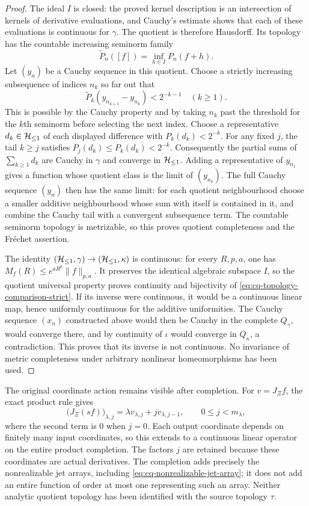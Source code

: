\begin{proof}
The ideal $I$ is closed: the proved kernel description is an
intersection of kernels of derivative evaluations, and Cauchy's
estimate shows that each of these evaluations is continuous for
$\gamma$. The quotient is therefore Hausdorff. Its topology has
the countable increasing seminorm family
\[
 \widetilde P_n([f])=\inf_{h\in I}P_n(f+h).
\]
Let $(y_n)$ be a Cauchy sequence in this quotient. Choose a
strictly increasing subsequence of indices $n_k$ so far out that
\[
 \widetilde P_k(y_{n_{k+1}}-y_{n_k})<2^{-k-1}
 \quad(k\geq1).
\]
This is possible by the Cauchy property and by taking $n_k$ past
the threshold for the $k$th seminorm before selecting the next
index. Choose a representative $d_k\in\mathcal H_{\leq 1}$ of each displayed
difference with $P_k(d_k)<2^{-k}$. For any fixed $j$, the tail
$k\geq j$ satisfies $P_j(d_k)\leq P_k(d_k)<2^{-k}$.
Consequently the partial sums of $\sum_{k\geq1}d_k$ are
Cauchy in $\gamma$ and converge in $\mathcal H_{\leq 1}$. Adding a
representative of $y_{n_1}$ gives a function whose quotient class
is the limit of $(y_{n_k})$. The full Cauchy sequence $(y_n)$
then has the same limit: for each quotient neighbourhood choose
a smaller additive neighbourhood whose sum with itself is
contained in it, and combine the Cauchy tail with a convergent
subsequence term. The countable seminorm topology is metrizable,
so this proves quotient completeness and the Fr\'echet assertion.

The identity $(\mathcal H_{\leq 1},\gamma)\to(\mathcal H_{\leq 1},\kappa)$ is continuous:
for every $R,p,a$, one has $M_f(R)\leq e^{aR^p}\|f\|_{p,a}$.
It preserves the identical algebraic subspace $I$, so the
quotient universal property proves continuity and bijectivity
of \eqref{eq:cq-topology-comparison-strict}. If its inverse
were continuous, it would be a continuous linear map, hence
uniformly continuous for the additive uniformities. The Cauchy
sequence $(x_n)$ constructed above would then be Cauchy in the
complete $Q_\gamma$, would converge there, and by continuity of
$\iota$ would converge in $Q_\kappa$, a contradiction. This
proves that its inverse is not continuous. No invariance of
metric completeness under arbitrary nonlinear homeomorphisms
has been used.
\end{proof}

The original coordinate action remains visible after completion.
For $v=J_\Xi f$, the exact product rule gives
\begin{equation}\label{eq:cq-original-s-on-completed-jets}
 \bigl(J_\Xi(sf)\bigr)_{\lambda,j}
 =\lambda v_{\lambda,j}+jv_{\lambda,j-1},
 \qquad 0\leq j<m_\lambda,
\end{equation}
where the second term is $0$ when $j=0$. Each output coordinate
depends on finitely many input coordinates, so this extends to
a continuous linear operator on the entire product completion.
The factors $j$ are retained because these coordinates are actual
derivatives. The completion adds precisely the nonrealizable
jet arrays, including \eqref{eq:cq-nonrealizable-jet-array}; it
does not add an entire function of order at most one representing
such an array. Neither analytic quotient topology has been
identified with the source topology $\tau$.


